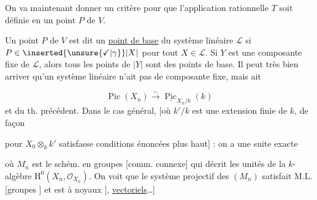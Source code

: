 
On va maintenant donner un critère pour que l'application rationnelle $T$ soit définie en un point $P$ de $V$.

Un point $P$ de $V$ est dit un \uline{point de base} du système linéaire $\mathcal L$ si $P\in\inserted{\unsure{\checkmark|\gamma}}|X|$ pour tout $X\in\mathcal L$. Si $Y$ est une composante fixe de $\mathcal L$, alors tous les points de $|Y|$ sont des points de base. Il peut très bien arriver qu'un système linéaire n'ait pas de composante fixe, mais ait



\[
\operatorname{Pic}(X_n)\xrightarrow{\sim}\underline{\operatorname{Pic}}_{X_n/k}(k)
\]
et du th. précédent. Dans le cas général,    [où $k'/k$ est une extension finie de $k$,  de façon



pour  $X_0\otimes_k k'$ satisfasse  conditions énoncées plus haut] : on a une suite exacte



où $M_n$ est le schém. en groupes [comm.  connexe]  qui décrit les unités de la $k$-algèbre  $\mathrm H^0(X_n,\mathcal O_{X_n})$. On voit que le système projectif des $(M_n)$ satisfait M.L. [groupes ] et est à noyaux  [, \uline{vectoriels}\ldots]

